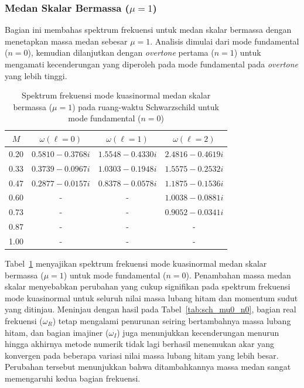 
\subsubsection*{Medan Skalar Bermassa ($\mu=1$)}

Bagian ini membahas spektrum frekuensi untuk medan skalar bermassa dengan menetapkan massa medan sebesar $\mu=1$. Analisis dimulai dari mode fundamental ($n=0$), kemudian dilanjutkan dengan \textit{overtone} pertama ($n=1$) untuk mengamati kecenderungan yang diperoleh pada mode fundamental pada \textit{overtone} yang lebih tinggi.

\begin{table}[H]
\centering
\caption{Spektrum frekuensi mode kuasinormal medan skalar bermassa ($\mu=1$) pada ruang-waktu Schwarzschild untuk mode fundamental ($n=0$)}
\vspace{0.2cm}
\renewcommand{\arraystretch}{1.25}
\begin{tabular}{cccc}
\toprule
$M$ & $\omega(\ell=0)$ & $\omega(\ell=1)$ & $\omega(\ell=2)$ \\
\midrule
0.20 & $0.5810 - 0.3768i$ & $1.5548 - 0.4330i$ & $2.4816 - 0.4619i$ \\
0.33 & $0.3739 - 0.0967i$ & $1.0303 - 0.1948i$ & $1.5575 - 0.2532i$ \\
0.47 & $0.2877 - 0.0157i$ & $0.8378 - 0.0578i$ & $1.1875 - 0.1536i$ \\
0.60 & - & - & $1.0038 - 0.0881i$ \\
0.73 & - & - & $0.9052 - 0.0341i$ \\
0.87 & - & - & - \\
1.00 & - & - & - \\
\bottomrule
\end{tabular}
\label{tab:sch_mu1_n0}
\end{table}

Tabel~\ref{tab:sch_mu1_n0} menyajikan spektrum frekuensi mode kuasinormal medan skalar bermassa ($\mu=1$) untuk mode fundamental ($n=0$). Penambahan massa medan skalar menyebabkan perubahan yang cukup signifikan pada spektrum frekuensi mode kuasinormal untuk seluruh nilai massa lubang hitam dan momentum sudut yang ditinjau. Meninjau dengan hasil pada Tabel~\ref{tab:sch_mu0_n0}, bagian real frekuensi ($\omega_R$) tetap mengalami penurunan seiring bertambahnya massa lubang hitam, dan bagian imajiner ($\omega_I$) juga menunjukkan kecenderungan menurun hingga akhirnya metode numerik tidak lagi berhasil menemukan akar yang konvergen pada beberapa variasi nilai massa lubang hitam yang lebih besar. Perubahan tersebut menunjukkan bahwa ditambahkannya massa medan sangat memengaruhi kedua bagian frekuensi.

